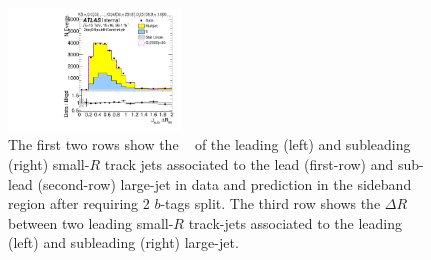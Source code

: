 \begin{figure}[htb!]
\begin{center}
\includegraphics[width=0.41\textwidth,angle=-90]{figures/boosted/Sideband/b77_TwoTag_split_Sideband_sublHCand_trk_dr.pdf}
  \caption{The first two rows show the \pt~ of the leading (left) and subleading (right) small-$R$ track jets associated to the lead (first-row) and sub-lead (second-row) large-\R jet in data and prediction in the sideband region after requiring 2 $b$-tags split. The third row shows the $\Delta R$ between two leading small-$R$ track-jets associated to the leading (left) and subleading (right) large-\R jet. }
  \label{fig:boosted-2bs-sideband-ak2}
\end{center}
\end{figure}


